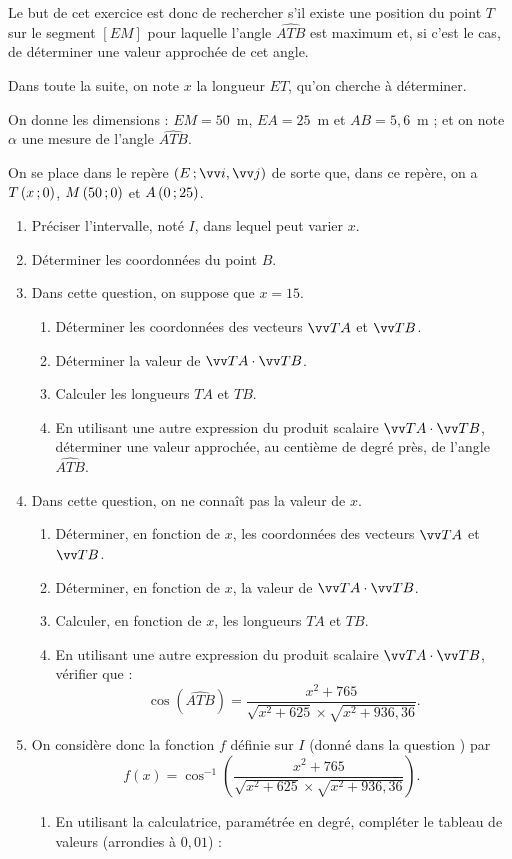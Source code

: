 \documentclass[a4paper,11pt]{article}
\begin{document}
Le but de cet exercice est donc de rechercher s'il existe une position du point $T$ sur le segment $[EM]$ pour laquelle l'angle $\widehat{ATB}$ est maximum et, si c'est le cas, de déterminer une valeur approchée de cet angle.

Dans toute la suite, on note $x$ la longueur $ET$, qu'on cherche à déterminer.

\smallskip

On donne les dimensions : $EM=50$~m, $EA=25$~m et $AB=5,6$~m ; et on note $\alpha$ une mesure de l'angle $\widehat{ATB}$.

\smallskip

On se place dans le repère $\left( E\,;\vect{i},\vect{j} \right)$ de sorte que, dans ce repère, on a $T\left(x\mathpunct{};0\right)$, $M\left(50\mathpunct{};0\right)$ et $A\left(0\mathpunct{};25\right)$. 

\begin{enumerate}
	\item Préciser l'intervalle, noté $I$, dans lequel peut varier $x$.
	\item Déterminer les coordonnées du point $B$.
	\item Dans cette question, on suppose que $x=15$.
	\begin{enumerate}
		\item Déterminer les coordonnées des vecteurs $\vect{TA}$ et $\vect{TB}$.
		\item Déterminer la valeur de $\vect{TA} \cdot \vect{TB}$.
		\item Calculer les longueurs $TA$ et $TB$.
		\item En utilisant une autre expression du produit scalaire $\vect{TA} \cdot \vect{TB}$, déterminer une valeur approchée, au centième de degré près, de l'angle $\widehat{ATB}$.
	\end{enumerate}
	\item Dans cette question, on ne connaît pas la valeur de $x$.
	\begin{enumerate}
		\item Déterminer, en fonction de $x$, les coordonnées des vecteurs $\vect{TA}$ et $\vect{TB}$.
		\item Déterminer, en fonction de $x$, la valeur de $\vect{TA} \cdot \vect{TB}$.
		\item Calculer, en fonction de $x$, les longueurs $TA$ et $TB$.
		\item En utilisant une autre expression du produit scalaire $\vect{TA} \cdot \vect{TB}$, vérifier que : \[\cos\left(\widehat{ATB}\right)=\dfrac{x^2+765}{\sqrt{x^2+625} \times \sqrt{x^2+936,36}}.\]
	\end{enumerate}
	\item On considère donc la fonction $f$ définie sur $I$ (donné dans la question ) par \[ f(x)=\cos^{-1} \left( \dfrac{x^2+765}{\sqrt{x^2+625} \times \sqrt{x^2+936,36}} \right).\]
	\begin{enumerate}
		\item En utilisant la calculatrice, paramétrée en degré, compléter le tableau de valeurs (arrondies à $0,01$) :
		

\end{enumerate}
\end{enumerate}
\end{document}
